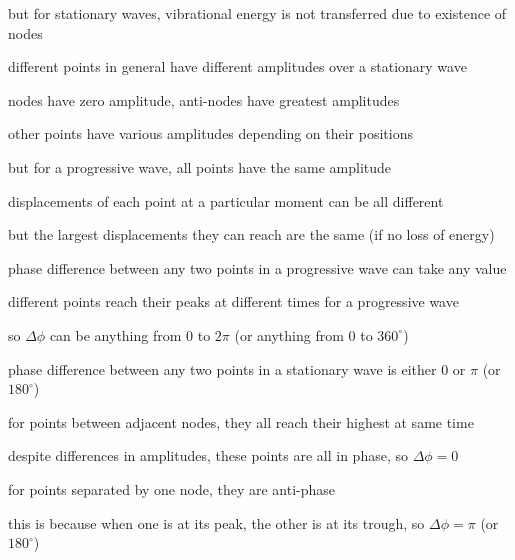but for stationary waves, vibrational energy is not transferred due to existence of nodes

\cmt different points in general have different amplitudes over a stationary wave

\hspace*{1.25em} nodes have zero amplitude, anti-nodes have greatest amplitudes

\hspace*{1.25em} other points have various amplitudes depending on their positions

but for a progressive wave, all points have the same amplitude

\hspace*{1.25em} displacements of each point at a particular moment can be all different

\hspace*{1.25em} but the largest displacements they can reach are the same (if no loss of energy)

\cmt phase difference between any two points in a progressive wave can take any value

\hspace*{1.25em} different points reach their peaks at different times for a progressive wave

\hspace*{1.25em} so $\Delta \phi$ can be anything from 0 to $2\pi$ (or anything from 0 to $360^\circ$)

phase difference between any two points in a stationary wave is either 0 or $\pi$ (or $180^\circ$)

\hspace*{1.25em} for points between adjacent nodes, they all reach their highest at same time

\hspace*{1.25em} despite differences in amplitudes, these points are all in phase, so $\Delta \phi=0$

\hspace*{1.25em} for points separated by one node, they are anti-phase

\hspace*{1.25em} this is because when one is at its peak, the other is at its trough, so $\Delta \phi = \pi$ (or $180^\circ$)





